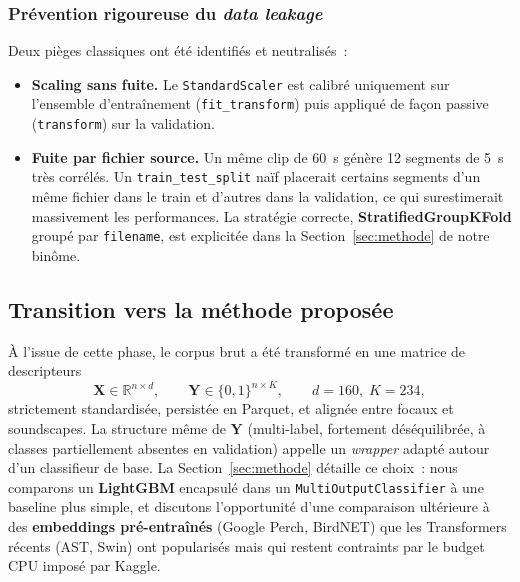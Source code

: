 \subsubsection{Prévention rigoureuse du \textit{data leakage}}
Deux pièges classiques ont été identifiés et neutralisés~:
\begin{itemize}
    \item \textbf{Scaling sans fuite.} Le \texttt{StandardScaler} est
          calibré uniquement sur l'ensemble d'entraînement
          (\texttt{fit\_transform}) puis appliqué de façon passive
          (\texttt{transform}) sur la validation.
    \item \textbf{Fuite par fichier source.} Un même clip de 60~s génère
          12 segments de 5~s très corrélés. Un \texttt{train\_test\_split}
          naïf placerait certains segments d'un même fichier dans le train et
          d'autres dans la validation, ce qui surestimerait massivement les
          performances. La stratégie correcte, \textbf{StratifiedGroupKFold}
          groupé par \texttt{filename}, est explicitée dans la
          Section~\ref{sec:methode} de notre binôme.
\end{itemize}

\subsection{Transition vers la méthode proposée}
\label{sec:transition}

À l'issue de cette phase, le corpus brut a été transformé en une matrice
de descripteurs
\[
    \mathbf{X} \in \mathbb{R}^{n \times d},
    \qquad
    \mathbf{Y} \in \{0,1\}^{n \times K},
    \qquad
    d = 160,\; K = 234,
\]
strictement standardisée, persistée en Parquet, et alignée entre focaux
et soundscapes. La structure même de $\mathbf{Y}$
(multi-label, fortement déséquilibrée, à classes partiellement absentes en
validation) appelle un \textit{wrapper} adapté autour d'un classifieur de
base. La Section~\ref{sec:methode} détaille ce choix~: nous comparons un
\textbf{LightGBM} encapsulé dans un \texttt{MultiOutputClassifier} à une
baseline plus simple, et discutons l'opportunité d'une comparaison
ultérieure à des \textbf{embeddings pré-entraînés} (Google Perch,
BirdNET) que les Transformers récents (AST, Swin) ont popularisés mais
qui restent contraints par le budget CPU imposé par Kaggle.